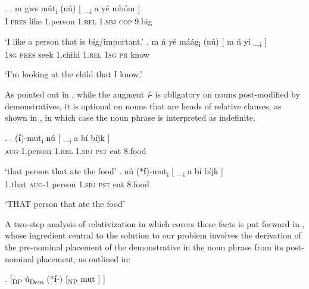 \ex. \citet[153--4]{Makasso2010}\label{Bas:big}
\ag. 
m  gws m\^ut\textsubscript{i} (n\'u)  [ \_\textsubscript{i}  a y\'e mb\'om ] \\
I \textsc{pres} like 1.person 1.\textsc{rel} {} {} 1.\textsc{sbj} \textsc{cop} 9.big\\
\strut `I like a person that is big/important.' 
\bg. 
m \'n y\'e m\'a\'ag\textsubscript{i} (n\'u) [ m \'n y\'i \_\textsubscript{i} ]\\
\textsc{1sg} \textsc{pres} seek 1.child \textsc{1.rel} {} \textsc{1sg} \textsc{pr} know\\
\strut `I'm looking at the child that I know.' 

As pointed out in \citet{Makasso2010}, while the augment \textit{\'i}- is obligatory on nouns post-modified by demonstratives, it is optional on nouns that are heads of relative clauses, as shown in \Next, in which case the noun phrase is interpreted as indefinite.

\ex.
\ag.
(\textbf{\'i})-mut\textsubscript{i} n\'u [ \_\textsubscript{i} a b\'i  b\'ijk ]\\
\textsc{aug}-1.person 1.\textsc{rel} {} {} \textsc{1.sbj} \textsc{pst} eat 8.food {}\\
\strut `that person that ate the food'\label{RelC:i}
\bg.
n\'u (*\textbf{\'i})-mut\textsubscript{i} [ \_\textsubscript{i} a b\'i  b\'ijk ]\\
1.that \textsc{aug}-1.person {} {} \textsc{1.sbj} \textsc{pst} eat 8.food\\
\strut `THAT person that ate the food'\label{RelC:senza-i}


\noindent A two-step analysis of relativization in  which covers these facts is put forward in \cite{Jenks-etall}, whose ingredient central to the solution to our  problem involves the derivation of the pre-nominal placement of the demonstrative in the noun phrase from its post-nominal placement, as outlined in:



 \ex.\label{DFCF}
\setlength{\arrowht}{3ex}
\newcommand*\cgdepthstrut{{\vrule height 0pt depth \arrowht width 0pt}}
\renewcommand\eachwordone{\cgdepthstrut\rmfamily}
\renewcommand\glt{\vskip -\topsep}
\let\trans=\glt
\newcommand\arrowex{\setlength{\arrowht}{1ex}\ex}
[\textsubscript{DP} \'u\textsubscript{Dem} (*\textbf{\'i}-) [\textsubscript{NP} mut ]    ]

